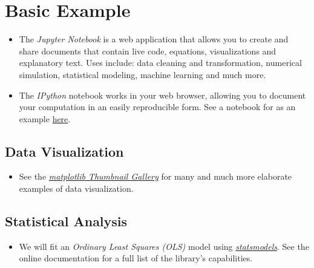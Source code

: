 \section{Basic Example}
\begin{itemize}
\item The \textit{Jupyter Notebook} is a web application that allows you to create and share documents that contain live code, equations, visualizations and explanatory text. Uses include: data cleaning and transformation, numerical simulation, statistical modeling, machine learning and much more.
\item The \textit{IPython} notebook works in your web browser, allowing you to document your computation in an easily reproducible form. See a notebook for 
\citet{Reinhart.2010} as an example \href{http://nbviewer.jupyter.org/github/vincentarelbundock/Reinhart-Rogoff/blob/master/reinhart-rogoff.ipynb}{here}.
\end{itemize}
\subsection{Data Visualization }
\begin{itemize}
\item See the \href{http://matplotlib.org/gallery.html}{\textit{matplotlib Thumbnail Gallery}} for many and much more elaborate examples of data visualization.
\end{itemize}
\subsection{Statistical Analysis}
\begin{itemize}
\item We will fit an \textit{Ordinary Least Squares (OLS)} model using \href{http://statsmodels.sourceforge.net}{\textit{statsmodels}}. See the online documentation for a full list of the library's capabilities.
\end{itemize}
